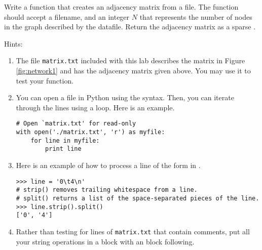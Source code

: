 \begin{problem}
Write a function that creates an adjacency matrix from a file. The function should accept a filename, and an integer $N$ that represents the number of nodes in the graph described by the datafile. Return the adjacency matrix as a  sparse . \\
\begin{comment}
\begin{lstlisting}
def to_matrix( filename, n ):
    ''' Return the nxn adjacency matrix described by the file.

    INPUTS:
    filename - Name of a .txt file describing a directed graph. Lines
            describing edges should have the form
        '<from node>\t<to node>'.
        The file may also include comments.
    n   - The number of nodes in the graph described by datafile

    RETURN:
    Return a NumPy array.
    '''
\end{lstlisting}
\end{comment}
Hints:
\begin{enumerate}
\item The file \texttt{matrix.txt} included with this lab describes the matrix in Figure \ref{fig:network1} and has the adjacency matrix  given above.
You may use it to test your function.

\item You can open a file in Python using the  syntax.
Then, you can iterate through the lines using a  loop.
Here is an example.
\begin{lstlisting}
# Open `matrix.txt' for read-only
with open('./matrix.txt', 'r') as myfile:
    for line in myfile:
        print line
\end{lstlisting}

\item Here is an example of how to process a line of the form in .
\begin{lstlisting}
>>> line = '0\t4\n'
# strip() removes trailing whitespace from a line.
# split() returns a list of the space-separated pieces of the line.
>>> line.strip().split()
['0', '4']
\end{lstlisting}

\item Rather than testing for lines of \texttt{matrix.txt} that contain comments, put all your string operations in a  block with an  block following.
\end{enumerate}
\end{problem}

